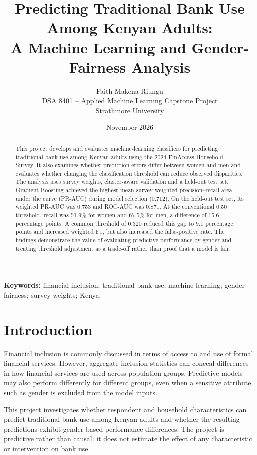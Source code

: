 \documentclass[11pt,a4paper]{article}
\title{\textbf{Predicting Traditional Bank Use Among Kenyan Adults:}\\
A Machine Learning and Gender-Fairness Analysis}
\author{Faith Makena Riungu\\
DSA 8401 -- Applied Machine Learning Capstone Project\\
Strathmore University}
\date{November 2026}
\begin{document}
\maketitle

\begin{abstract}
This project develops and evaluates machine-learning classifiers for predicting traditional bank use among Kenyan adults using the 2024 FinAccess Household Survey. It also examines whether prediction errors differ between women and men and evaluates whether changing the classification threshold can reduce observed disparities. The analysis uses survey weights, cluster-aware validation and a held-out test set. Gradient Boosting achieved the highest mean survey-weighted precision--recall area under the curve (PR-AUC) during model selection (0.712). On the held-out test set, its weighted PR-AUC was 0.753 and ROC-AUC was 0.871. At the conventional 0.50 threshold, recall was 51.9\% for women and 67.5\% for men, a difference of 15.6 percentage points. A common threshold of 0.320 reduced this gap to 9.1 percentage points and increased weighted F1, but also increased the false-positive rate. The findings demonstrate the value of evaluating predictive performance by gender and treating threshold adjustment as a trade-off rather than proof that a model is fair.
\end{abstract}

\textbf{Keywords:} financial inclusion; traditional bank use; machine learning; gender fairness; survey weights; Kenya.

\section{Introduction}

Financial inclusion is commonly discussed in terms of access to and use of formal financial services. However, aggregate inclusion statistics can conceal differences in how financial services are used across population groups. Predictive models may also perform differently for different groups, even when a sensitive attribute such as gender is excluded from the model inputs.

This project investigates whether respondent and household characteristics can predict traditional bank use among Kenyan adults and whether the resulting predictions exhibit gender-based performance differences. The project is predictive rather than causal: it does not estimate the effect of any characteristic or intervention on bank use.
\end{document}

